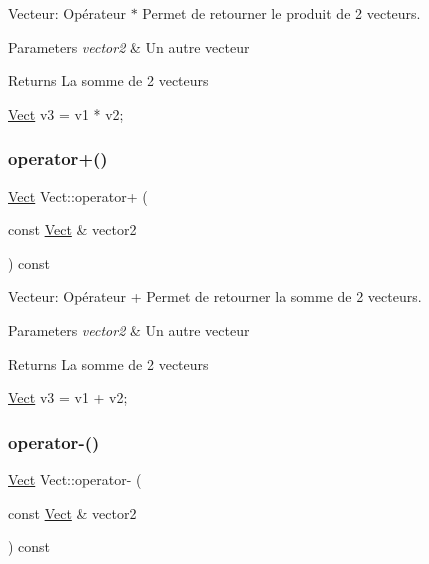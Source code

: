 Vecteur\+: Opérateur $\ast$ Permet de retourner le produit de 2 vecteurs. 


\begin{DoxyParams}{Parameters}
{\em vector2} & Un autre vecteur \\
\hline
\end{DoxyParams}
\begin{DoxyReturn}{Returns}
La somme de 2 vecteurs 
\begin{DoxyCode}
\hyperlink{classVect}{Vect} v3 = v1 * v2;
\end{DoxyCode}
 
\end{DoxyReturn}
\mbox{\label{classVect_a7b55d7a81e3a6770d03cbe50b9fcf1cf}} 
\subsubsection{\texorpdfstring{operator+()}{operator+()}}
{\footnotesize\ttfamily \hyperlink{classVect}{Vect} Vect\+::operator+ (\begin{DoxyParamCaption}\item[{const \hyperlink{classVect}{Vect} \&}]{vector2 }\end{DoxyParamCaption}) const}



Vecteur\+: Opérateur + Permet de retourner la somme de 2 vecteurs. 


\begin{DoxyParams}{Parameters}
{\em vector2} & Un autre vecteur \\
\hline
\end{DoxyParams}
\begin{DoxyReturn}{Returns}
La somme de 2 vecteurs 
\begin{DoxyCode}
\hyperlink{classVect}{Vect} v3 = v1 + v2;
\end{DoxyCode}
 
\end{DoxyReturn}
\mbox{\label{classVect_a6d4d06eb29739cfc9ab0a658ba534254}} 
\subsubsection{\texorpdfstring{operator-\/()}{operator-()}}
{\footnotesize\ttfamily \hyperlink{classVect}{Vect} Vect\+::operator-\/ (\begin{DoxyParamCaption}\item[{const \hyperlink{classVect}{Vect} \&}]{vector2 }\end{DoxyParamCaption}) const}



